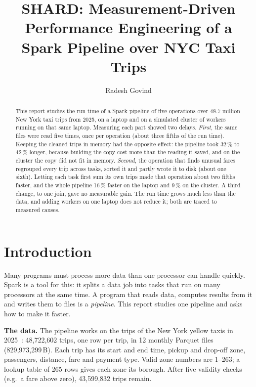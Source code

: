 \documentclass[sigconf]{acmart}
\begin{document}
\title{SHARD: Measurement-Driven Performance Engineering of a Spark Pipeline over NYC Taxi Trips}

\author{Radesh Govind}

\begin{abstract}
This report studies the run time of a Spark pipeline of five operations over 48.7 million New
York taxi trips from 2025, on a laptop and on a simulated cluster of workers running on that
same laptop. Measuring each part showed two delays. \emph{First}, the same files were read five
times, once per operation (about three fifths of the run time). Keeping the cleaned trips in
memory had the opposite effect: the pipeline took 32\,\% to 42\,\% longer, because building
the copy cost more than the reading it saved, and on the cluster the copy did not fit in
memory. \emph{Second}, the operation that finds unusual fares regrouped every trip across tasks,
sorted it and partly wrote it to disk (about one sixth). Letting each task first sum its own
trips made that operation about two fifths faster, and the whole pipeline 16\,\% faster on the
laptop and 9\,\% on the cluster. A third change, to one join, gave no measurable gain. The run
time grows much less than the data, and adding workers on one laptop does not reduce it; both
are traced to measured causes.
\end{abstract}


\maketitle

\section{Introduction}

Many programs must process more data than one processor can handle quickly. Spark is a tool
for this: it splits a data job into tasks that run on many processors at the same time. A
program that reads data, computes results from it and writes them to files is a
\emph{pipeline}. This report studies one pipeline and asks how to make it faster.

\textbf{The data.} The pipeline works on the trips of the New York yellow taxis in
2025~\cite{tlcdata}: 48,722,602 trips, one row per trip, in 12 monthly Parquet files
(829,973,299\,B). Each trip has its start and end time, pickup and drop-off zone, passengers,
distance, fare and payment type. Valid zone numbers are 1--263; a lookup table of 265 rows gives
each zone its borough. After five validity checks (e.g.\ a fare above zero), 43,599,832 trips
remain.
\end{document}
